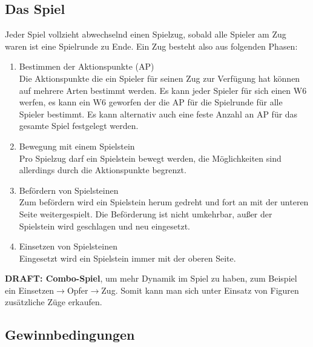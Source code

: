 \documentclass{article}
\begin{document}
	
\subsection{Das Spiel}

	Jeder Spiel vollzieht abwechselnd einen Spielzug, sobald alle Spieler am Zug waren
	ist eine Spielrunde zu Ende. Ein Zug besteht also aus folgenden Phasen:
	
	
	\begin{enumerate}
	\item Bestimmen der Aktionspunkte (AP) \\
		  Die Aktionspunkte die ein Spieler für seinen Zug zur Verfügung hat können auf mehrere Arten bestimmt werden.
		  Es kann jeder Spieler für sich einen W6 werfen, es kann ein W6 geworfen der die AP für die Spielrunde für alle Spieler bestimmt.
		  Es kann alternativ auch eine feste Anzahl an AP für das gesamte Spiel festgelegt werden.
		  
	\item Bewegung mit einem Spielstein \\
		  Pro Spielzug darf ein Spielstein bewegt werden, die Möglichkeiten sind allerdings durch die Aktionspunkte begrenzt.
		   
	\item Befördern von Spielsteinen \\
		  Zum befördern wird ein Spielstein herum gedreht und fort an mit der unteren Seite weitergespielt.
		  Die Beförderung ist nicht umkehrbar, außer der Spielstein wird geschlagen und neu eingesetzt.
		  
	\item Einsetzen von Spielsteinen \\
		  Eingesetzt wird ein Spielstein immer mit der oberen Seite.
	\end{enumerate}
	
	
	
	\textbf{DRAFT: Combo-Spiel}, um mehr Dynamik im Spiel zu haben, 
	zum Beispiel ein Einsetzen$\rightarrow$Opfer$\rightarrow$Zug.
	Somit kann man sich unter Einsatz von Figuren zusätzliche Züge erkaufen.
	
	


\subsection{Gewinnbedingungen}
\end{document}
